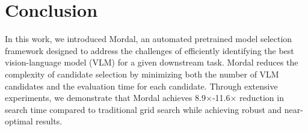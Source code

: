 



\section{Conclusion}
In this work, we introduced Mordal, an automated pretrained model selection framework designed to address the challenges of efficiently identifying the best vision-language model (VLM) for a given downstream task. Mordal reduces the complexity of candidate selection by minimizing both the number of VLM candidates and the evaluation time for each candidate. Through extensive experiments, we demonstrate that Mordal achieves 8.9$\times$-11.6$\times$ reduction in search time compared to traditional grid search while achieving robust and near-optimal results.

